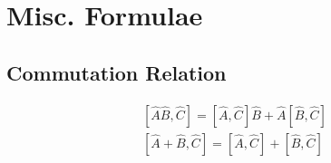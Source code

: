 \documentclass{book}
\begin{document}
\chapter{Misc. Formulae}
\section{Commutation Relation}
\begin{align}
	\left[\hat{A}\hat{B}, \hat{C}\right] = \left[\hat{A}, \hat{C}\right]\hat{B} + \hat{A}\left[\hat{B},\hat{C}\right] \\
	\left[\hat{A} + \hat{B}, \hat{C}\right] = \left[\hat{A}, \hat{C}\right] + \left[\hat{B},\hat{C}\right]
\end{align}
\end{document}
